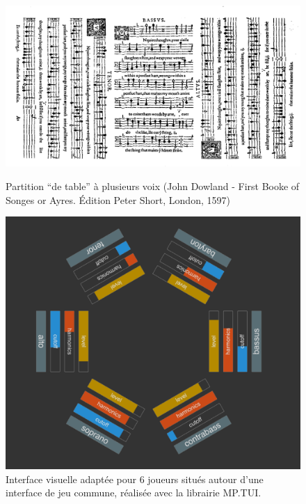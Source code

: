\begin{figure}[!htbp]
	\captionsetup{format=plain}%
	\centering
	\begin{minipage}[t]{0.48\textwidth}
		\includegraphics[width=\linewidth]{gfx/06_visual_representation/Dowland-firstBookOfSonges.png}
		\caption[Partition ``de table'' à plusieurs voix]{Partition ``de table'' à plusieurs voix (John Dowland - First Booke of Songes or Ayres. Édition Peter Short, London, 1597)}
		\label{fig:visual_representation:table_music}
	\end{minipage}
	\hspace{.02\linewidth}
	\begin{minipage}[t]{0.48\textwidth}
	    \includegraphics[width=\linewidth]{gfx/06_visual_representation/mpTUI_multi-orientation.png}
		\caption[Interface visuelle adaptée pour 6 joueurs]{Interface visuelle adaptée pour 6 joueurs situés autour d'une interface de jeu commune, réalisée avec la librairie MP.TUI.}
		\label{fig:visual_representation:multi_orientation}
	\end{minipage}
\end{figure}

